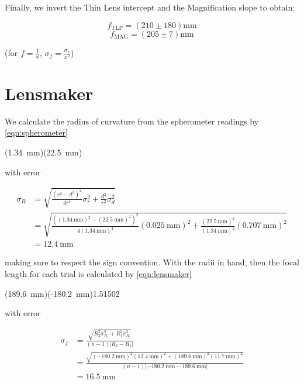 Finally, we invert the Thin Lens intercept and the Magnification slope to obtain:

\[f_\text{TLP} = (210 \pm 180) \unit{\milli\metre}\]
\[f_\text{MAG} = (205 \pm 7) \unit{\milli\metre}\]

(for $f = \frac{1}{x}$, $\sigma_f = \frac{\sigma_x}{x^2}$)


\section{Lensmaker}

We calculate the radius of curvature from the spherometer readings by \cref{eqn:spherometer}

{{\left(\qty{1.34}{\milli\metre}\right)}{\left(\qty{22.5}{\milli\metre}\right)}}

with error

\begin{align*}
    \sigma_R &= \sqrt{\frac{\left(r^2 - d^2\right)^2}{4r^4}\sigma_r^2 + \frac{d^2}{r^2}\sigma_d^2} \\
    &= \sqrt{\frac{\left(\left(\qty{1.34}{\milli\metre}\right)^2 - \left(\qty{22.5}{\milli\metre}\right)^2\right)^2}{4\left(\qty{1.34}{\milli\metre}\right)^4}\left(\qty{0.025}{\milli\metre}\right)^2 + \frac{\left(\qty{22.5}{\milli\metre}\right)^2}{\left(\qty{1.34}{\milli\metre}\right)^2}\left(\qty{0.707}{\milli\metre}\right)^2} \\
    &= \qty{12.4}{\milli\metre}
\end{align*}

making sure to respect the sign convention. With the radii in hand, then the focal length for each trial is calculated by \cref{eqn:lensmaker}

{{\left(\qty{189.6}{\milli\metre}\right)}{\left(-\qty{180.2}{\milli\metre}\right)}{1.51502}}

with error

\begin{align*}
    \sigma_f &= \frac{\sqrt{R_2^2 \sigma_{R_1}^2 + R_1^2 \sigma_{R_2}^2}}{(n-1)|R_2 - R_1|} \\
    &= \frac{\sqrt{\left(\qty{-180.2}{\milli\metre}\right)^2 \left(\qty{12.4}{\milli\metre}\right)^2 + \left(\qty{189.6}{\milli\metre}\right)^2 \left(\qty{11.7}{\milli\metre}\right)^2}}{(n-1)|\qty{-180.2}{\milli\metre} - \qty{189.6}{\milli\metre}|} \\
    &= \qty{16.5}{\milli\metre}
\end{align*}

